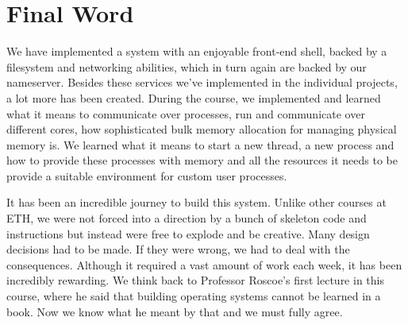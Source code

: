 \section{Final Word}
We have implemented a system with an enjoyable front-end shell, backed by a filesystem and networking abilities, which in turn 
again are backed by our nameserver. Besides these services we've implemented in the individual projects, a lot more has been created.
During the course, we implemented and learned what it means to communicate over processes, run and communicate over different cores,
how sophisticated bulk memory allocation for managing physical memory is. We learned what it means to start a new thread,
a new process and how to provide these processes with memory and all the resources it needs to be provide a suitable
environment for custom user processes.

It has been an incredible journey to build this system. Unlike other courses at ETH, we were not forced into a direction
by a bunch of skeleton code and instructions but instead were free to explode and be creative. Many design decisions had to
be made. If they were wrong, we had to deal with the consequences. Although it required a vast amount of work each week,
it has been incredibly rewarding. We think back to Professor Roscoe's first lecture in this course, where he said that 
building operating systems cannot be learned in a book. Now we know what he meant by that and we must fully agree.
